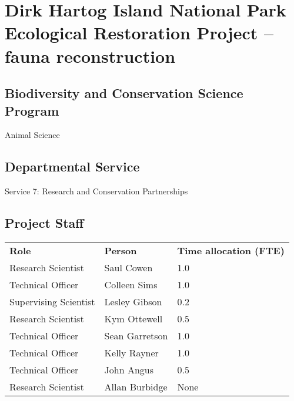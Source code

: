 \documentclass[version=last,
    paper=a4,                               %
    10pt,                                   %
    dvipsnames,
    oneside,                              %
    headings=openany,                       %
    open=any,
    BCOR=7mm,                               %
    DIV=15,     %
]{scrbook}
\begin{document}
\frontmatter
\maketitle
\mainmatter



\section*{Dirk Hartog Island National Park Ecological Restoration Project -- fauna
reconstruction
}



\subsection*{Biodiversity and Conservation Science Program}

Animal Science




\subsection*{Departmental Service}

Service 7: Research and Conservation Partnerships


\subsection*{Project Staff}
\begin{tabu} {X X X}
\textbf{Role} & \textbf{Person} & \textbf{Time allocation (FTE)}\\

Research Scientist & Saul Cowen & 1.0\\

Technical Officer & Colleen Sims & 1.0\\

Supervising Scientist & Lesley Gibson & 0.2\\

Research Scientist & Kym Ottewell & 0.5\\

Technical Officer & Sean Garretson & 1.0\\

Technical Officer & Kelly Rayner & 1.0\\

Technical Officer & John Angus & 0.5\\

Research Scientist & Allan Burbidge & None\\

\end{tabu}
\end{document}
